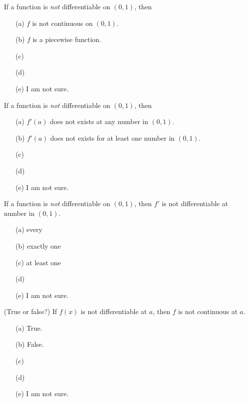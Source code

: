 \documentclass[14pt]{beamer}
\begin{document}
\begin{frame}
  If a function is \emph{not} differentiable on \((0,1)\), then 

  \medskip
  \begin{itemize} \setlength\itemsep{2ex}
    \item[(a)] \(f\) is not continuous on \((0,1)\).
    \item[(b)] \(f\) is a piecewise function.
    \item[(c)] 
    \item[(d)] 
    \item[(e)] I am not sure.
  \end{itemize} 
\end{frame}


\begin{frame}
  If a function is \emph{not} differentiable on \((0,1)\), then 

  \medskip
  \begin{itemize} \setlength\itemsep{2ex}
    \item[(a)] \(f'(a)\) does not exists at any number in \((0,1)\).
    \item[(b)] \(f'(a)\) does not exists for at least one number in \((0,1)\).
    \item[(c)] 
    \item[(d)] 
    \item[(e)] I am not sure.
  \end{itemize} 
\end{frame}


\begin{frame}
  If a function is \emph{not} differentiable on \((0,1)\), then \(f'\) is not differentiable at \underline{\hspace{1in}} number in \((0,1)\).

  \medskip
  \begin{itemize} \setlength\itemsep{2ex}
    \item[(a)] every 
    \item[(b)] exactly one
    \item[(c)] at least one
    \item[(d)] 
    \item[(e)] I am not sure.
  \end{itemize} 
\end{frame}


\begin{frame}
  (True or false?) If \(f(x)\) is not differentiable at \(a\), then \(f\) is not continuous at \(a\).

  \medskip
  \begin{itemize} \setlength\itemsep{2ex}
    \item[(a)] True.
    \item[(b)] False.
    \item[(c)] 
    \item[(d)] 
    \item[(e)] I am not sure.
  \end{itemize} 
\end{frame}
\end{document}
